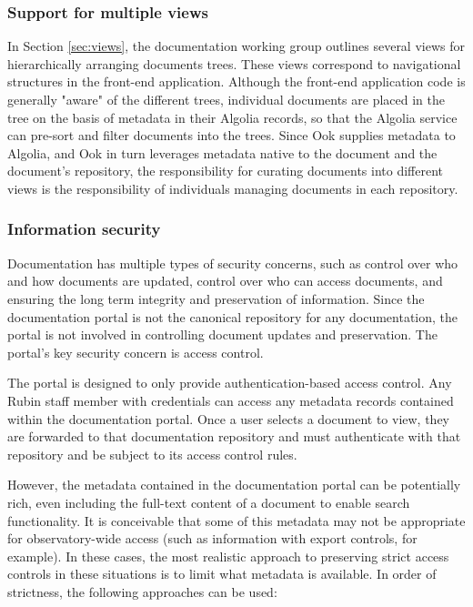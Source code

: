 \subsubsection{Support for multiple views}

In Section \ref{sec:views}, the documentation working group outlines several views for hierarchically arranging documents trees. These views correspond to navigational structures in the front-end application. Although the front-end application code is generally "aware" of the different trees, individual documents are placed in the tree on the basis of metadata in their Algolia records, so that the Algolia service can pre-sort and filter documents into the trees. Since Ook supplies metadata to Algolia, and Ook in turn leverages metadata native to the document and the document's repository, the responsibility for curating documents into different views is the responsibility of individuals managing documents in each repository.

\subsubsection{Information security}

Documentation has multiple types of security concerns, such as control over who and how documents are updated, control over who can access documents, and ensuring the long term integrity and preservation of information. Since the documentation portal is not the canonical repository for any documentation, the portal is not involved in controlling document updates and preservation. The portal's key security concern is access control.

The portal is designed to only provide authentication-based access control. Any Rubin staff member with credentials can access any metadata records contained within the documentation portal. Once a user selects a document to view, they are forwarded to that documentation repository and must authenticate with that repository and be subject to its access control rules.

However, the metadata contained in the documentation portal can be potentially rich, even including the full-text content of a document to enable search functionality. It is conceivable that some of this metadata may not be appropriate for observatory-wide access (such as information with export controls, for example). In these cases, the most realistic approach to preserving strict access controls in these situations is to limit what metadata is available. In order of strictness, the following approaches can be used:

